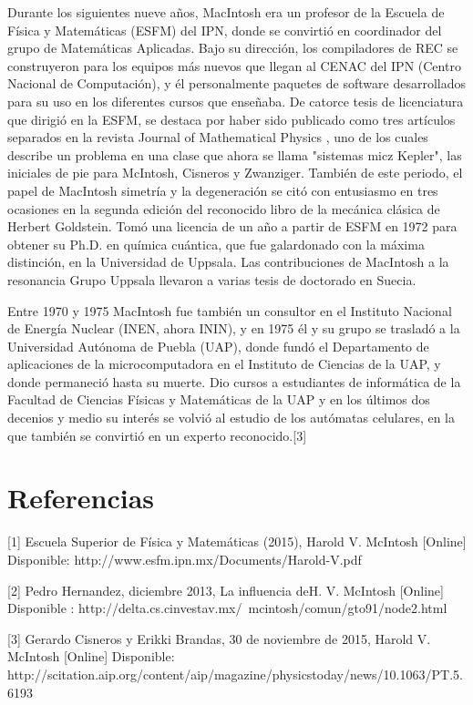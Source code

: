 \documentclass[10pt,letterpaper]{article}
\begin{document}
Durante los siguientes nueve años, MacIntosh era un profesor de la Escuela de Física y Matemáticas (ESFM) del IPN, donde se convirtió en coordinador del grupo de Matemáticas Aplicadas. Bajo su dirección, los compiladores de REC se construyeron para los equipos más nuevos que llegan al CENAC del IPN (Centro Nacional de Computación), y él personalmente paquetes de software desarrollados para su uso en los diferentes cursos que enseñaba. De catorce tesis de licenciatura que dirigió en la ESFM, se destaca por haber sido publicado como tres artículos separados en la revista Journal of Mathematical Physics , uno de los cuales  describe un problema en una clase que ahora se llama "sistemas micz Kepler", las iniciales de pie para McIntosh, Cisneros y Zwanziger. También de este periodo, el papel de MacIntosh simetría y la degeneración  se citó con entusiasmo en tres ocasiones en la segunda edición del reconocido libro de la mecánica clásica de Herbert Goldstein.  Tomó una licencia de un año a partir de ESFM en 1972 para obtener su Ph.D. en química cuántica, que fue galardonado con la máxima distinción, en la Universidad de Uppsala. Las contribuciones de MacIntosh a la resonancia Grupo Uppsala llevaron a varias tesis de doctorado en Suecia.

Entre 1970 y 1975 MacIntosh fue también un consultor en el Instituto Nacional de Energía Nuclear (INEN, ahora ININ), y en 1975 él y su grupo se trasladó a la Universidad Autónoma de Puebla (UAP), donde fundó el Departamento de aplicaciones de la microcomputadora en el Instituto de Ciencias de la UAP, y donde permaneció hasta su muerte. Dio cursos a estudiantes de informática de la Facultad de Ciencias Físicas y Matemáticas de la UAP y en los últimos dos decenios y medio su interés se volvió al estudio de los autómatas celulares, en la que también se convirtió en un experto reconocido.[3] 

\section{Referencias }
[1] Escuela Superior de Física y Matemáticas (2015), Harold V. McIntosh [Online] Disponible:
http://www.esfm.ipn.mx/Documents/Harold-V.pdf

[2] Pedro Hernandez, diciembre 2013, La influencia deH. V. McIntosh [Online] Disponible :
http://delta.cs.cinvestav.mx/~mcintosh/comun/gto91/node2.html

[3] Gerardo Cisneros y Erikki Brandas, 30 de noviembre de 2015, Harold V. McIntosh [Online]
Disponible: http://scitation.aip.org/content/aip/magazine/physicstoday/news/10.1063/PT.5.6193
\end{document}
